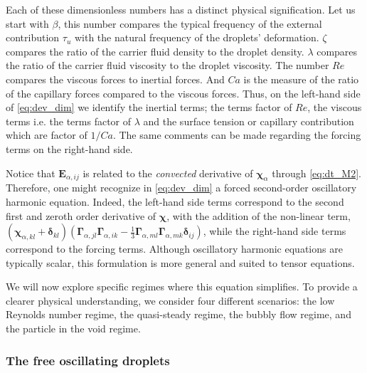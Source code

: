 Each of these dimensionless numbers has a distinct physical signification. 
Let us start with $\beta$, this number compares the typical frequency of the external contribution $\tau_u$ with the natural frequency of the droplets' deformation.
$\zeta$ compares the ratio of the carrier fluid density to the droplet density. 
$\lambda$ compares the ratio of the carrier fluid viscosity to the droplet viscosity. 
The number $Re$ compares the viscous forces to inertial forces. 
And $Ca$ is the measure of the ratio of the capillary forces compared to the viscous forces. 
Thus, on the left-hand side of \ref{eq:dev_dim} we identify the inertial terms; the terms factor of $Re$, the viscous terms i.e. the terms factor of $\lambda$ and the surface tension or capillary contribution which are factor of $1/Ca$. 
The same comments can be made regarding the forcing terms on the right-hand side. 

Notice that $\textbf{E}_{\alpha,ij}$ is related to the \textit{convected} derivative of $\bm\chi_\alpha$ through \ref{eq:dt_M2}. 
Therefore, one might recognize in \ref{eq:dev_dim} a forced second-order oscillatory harmonic equation.
Indeed, the left-hand side terms correspond to the second first and zeroth order derivative of $\bm\chi$, with the addition of the non-linear term, $ (\bm\chi_{\alpha,kl}+\bm\delta_{kl}) 
(\bm\Gamma_{\alpha,jl}\bm\Gamma_{\alpha,ik}  
- \frac{1}{3}
\bm\Gamma_{\alpha,ml}\bm\Gamma_{\alpha,mk}  
\bm\delta_{ij}
)$, while the right-hand side terms correspond to the forcing terms. Although oscillatory harmonic equations are typically scalar, this formulation is more general and suited to tensor equations. 

We will now explore specific regimes where this equation simplifies. To provide a clearer physical understanding, we consider four different scenarios: the low Reynolds number regime, the quasi-steady regime, the bubbly flow regime, and the particle in the void regime. 


\subsubsection{The free oscillating droplets}

